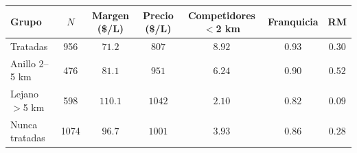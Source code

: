 \begin{tabular}{lcccccc}
\toprule
Grupo & $N$ & Margen (\$/L) & Precio (\$/L) & Competidores $<$2 km & Franquicia & RM \\
\midrule
Tratadas &  956 & $71.2$ & $807$ & $8.92$ & $0.93$ & $0.30$ \\
Anillo 2--5 km &  476 & $81.1$ & $951$ & $6.24$ & $0.90$ & $0.52$ \\
Lejano $>$5 km &  598 & $110.1$ & $1042$ & $2.10$ & $0.82$ & $0.09$ \\
Nunca tratadas & 1074 & $96.7$ & $1001$ & $3.93$ & $0.86$ & $0.28$ \\
\bottomrule
\end{tabular}
